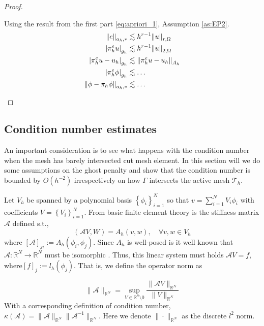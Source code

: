 \begin{proof}
\begin{enumerate}[label=\arabic*)]
Using the result from the first part \eqref{eq:apriori_1}, Assumption \ref{as:EP2}.
\[
    \begin{split}
        \| e \|_{ a_{h},*  }^{  } &\lesssim h^{r-1} \| u \|_{ r, \Omega  }^{  } \\
        \left\lvert  \pi^{e} _{h} u  \right\rvert _{g_{h}} &\lesssim h^{r-1}\| u \|_{2,\Omega   }^{  } \\
        \left\lvert  \pi^{e} _{h} u - u_{h}  \right\rvert _{g_{h}} &\lesssim \|  \pi^{e} _{h} u - u_{h} \|_{ A_{h}  }^{  }  \\
        \left\lvert  \pi^{e} _{h} \phi   \right\rvert _{g_{h}} &\lesssim  \ldots \\
        \|\phi - \pi _{h} \phi  \|_{a_{h},*  }^{  }  &\lesssim  \ldots
    \end{split}
\]

    \end{enumerate}


\end{proof}


\subsection{Condition number estimates}%
\label{sub:condition_number_estimates}


An important consideration is to see what happens with the condition number when the mesh has barely intersected cut mesh element. In this section will we do some assumptions on the ghost penalty and show that the condition number is bounded by $O( h^{-2}) $ irrespectively on how $\Gamma $ intersects the active mesh $\mathcal{T}_{h} $.

Let $V_{h}$ be spanned by a polynomial basis  $\left\{ \phi _{i}  \right\}_{i=1}^{N} $ so that $v = \sum_{i=1}^{N} V_{i}\phi _{i}$ with coefficients $V= \left\{ V_{i} \right\} _{i=1}^{N}$. From basic finite element theory is the stiffness matrix
$\mathcal{A} $ defined s.t.,
\[
    ( \mathcal{A} V, W)  = A_{h}( v,w), \quad \forall v,w \in V_{h}
\]
where $ \left[ \mathcal{A} \right] _{ji} := A_{h}( \phi _{i}, \phi_{j} )$.
Since $A_{h}$ is well-posed is it well known that $\mathcal{A}: \mathbb{R} ^{N} \to \mathbb{R} ^{N} $ must be isomorphic \cite{ern2006evaluation}.  Thus, this linear system must holds $ \mathcal{A} V = f$, where$\left[ f \right] _{j} := l_{h}(\phi_{j} )$. That is, we define the operator norm as


\begin{equation}
\label{eq:operator_norm}
 \| \mathcal{A}  \|_{ \mathbb{R} ^{N}  }^{  } = \sup_{V \in \mathbb{R} ^{n} \setminus 0 } \frac{\| \mathcal{A} V \|_{ \mathbb{R} ^{N} }^{  } }{\| V \|_{ \mathbb{R} ^{N} }^{  } }
\end{equation}
 With a corresponding definition of condition number, \( \kappa ( \mathcal{A} )  = \| \mathcal{A}  \|_{ \mathbb{R} ^{N} }^{  } \| \mathcal{A}^{-1}  \|_{ \mathbb{R} ^{N} }^{  }    \).
 Here we denote $\| \cdot  \|_{ \mathbb{R} ^{N} }^{  } $  as the discrete $l^{2}$ norm.


